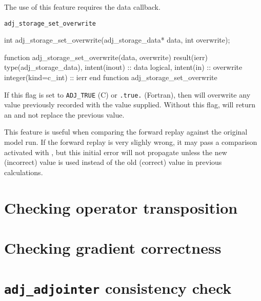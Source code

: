 The use of this feature requires the  data callback.

\begin{boxwithtitle}{\texttt{adj_storage_set_overwrite}}
\begin{minipage}{\columnwidth}
\begin{ccode}
  int adj_storage_set_overwrite(adj_storage_data* data, int overwrite);
\end{ccode}
\begin{fortrancode}
  function adj_storage_set_overwrite(data, overwrite)
           result(ierr)
    type(adj_storage_data), intent(inout) :: data
    logical, intent(in) :: overwrite
    integer(kind=c_int) :: ierr
  end function adj_storage_set_overwrite
\end{fortrancode}
\end{minipage}
\end{boxwithtitle}
If this flag is set to \texttt{ADJ_TRUE} (C) or \texttt{.true.} (Fortran),
then  will overwrite any value previously recorded
with the value supplied. Without this flag,  will
return an  and not replace the previous value.

This feature is useful when comparing the forward replay against the original
model run. If the forward replay is very slighly wrong, it may pass a comparison
activated with , but this initial error will
not propagate unless the new (incorrect) value is used instead of the old (correct)
value in previous calculations.

\section{Checking operator transposition}
\section{Checking gradient correctness} \label{sec:derivative_test}
\section{\texttt{adj_adjointer} consistency check}
